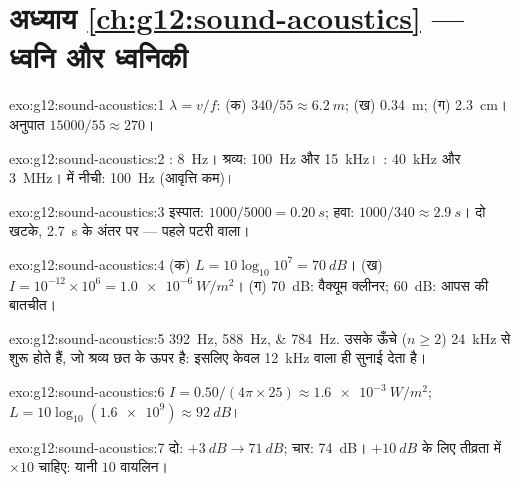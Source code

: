 \section*{अध्याय \ref{ch:g12:sound-acoustics} --- ध्वनि और ध्वनिकी}

\begin{solution}{exo:g12:sound-acoustics:1}
$\lambda = v/f$: (क) $340/55 \approx \qty{6.2}{m}$; (ख) \qty{0.34}{m}; (ग) \qty{2.3}{cm}। अनुपात $15000/55 \approx 270$।
\end{solution}

\begin{solution}{exo:g12:sound-acoustics:2}
: \qty{8}{Hz}। श्रव्य: \qty{100}{Hz} और \qty{15}{kHz}। : \qty{40}{kHz}
और \qty{3}{MHz}।  में नीची: \qty{100}{Hz} (आवृत्ति कम)।
\end{solution}

\begin{solution}{exo:g12:sound-acoustics:3}
इस्पात: $1000/5000 = \qty{0.20}{s}$; हवा: $1000/340 \approx
\qty{2.9}{s}$। दो खटके, \qty{2.7}{s} के अंतर पर --- पहले पटरी वाला।
\end{solution}

\begin{solution}{exo:g12:sound-acoustics:4}
(क) $L = 10\log_{10}10^{7} = \qty{70}{dB}$। (ख) $I = 10^{-12} \times
10^{6} = \qty{1.0e-6}{W/m^2}$। (ग) \qty{70}{dB}: वैक्यूम क्लीनर; \qty{60}{dB}: आपस की बातचीत।
\end{solution}

\begin{solution}{exo:g12:sound-acoustics:5}
\qtylist{392;588;784}{Hz}. उसके ऊँचे  ($n \ge 2$) \qty{24}{kHz} से शुरू
होते हैं, जो श्रव्य छत के ऊपर है: इसलिए केवल \qty{12}{kHz} वाला  ही
सुनाई देता है।
\end{solution}

\begin{solution}{exo:g12:sound-acoustics:6}
$I = 0.50/(4\pi \times 25) \approx \qty{1.6e-3}{W/m^2}$; $L = 10\log_{10}(\num{1.6e9}) \approx \qty{92}{dB}$।
\end{solution}

\begin{solution}{exo:g12:sound-acoustics:7}
दो: $+\qty{3}{dB} \to \qty{71}{dB}$; चार: \qty{74}{dB}। $+\qty{10}{dB}$ के लिए तीव्रता में $\times 10$ चाहिए: यानी $10$
वायलिन।
\end{solution}

